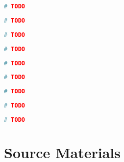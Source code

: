 \documentclass[twoside, 11pt]{article}
\begin{document}
\begin{appendices}
    \begin{lstlisting}[language=python, caption={Prompt Engineering Framework: \textbf{prompt\_utils.py}}, label={lst:prompt-utils}]
    # TODO \end{lstlisting}
    \begin{lstlisting}[language=python, caption={Data Processing Pipeline: \textbf{file\_utils.py}}, label={lst:file-utils}]
    # TODO \end{lstlisting}
    \begin{lstlisting}[language=python, caption={Experiment Controller: \textbf{exp.py}}, label={lst:exp}]
    # TODO \end{lstlisting}
    \begin{lstlisting}[language=python, caption={Evaluation Results Systhesis: \textbf{eval.py}}, label={lst:eval}]
    # TODO \end{lstlisting}
    \begin{lstlisting}[language=python, caption={Truncation Checking: \textbf{check\_truncation.py}}, label={lst:check-truncation}]
    # TODO \end{lstlisting}
    \begin{lstlisting}[language=python, caption={Configuration Constants: \textbf{constants.py}}, label={lst:constants}]
    # TODO \end{lstlisting}
    \begin{lstlisting}[language=python, caption={Inter-Annotator Agreement Calculation: \textbf{agreement.py}}, label={lst:agreement}]
    # TODO \end{lstlisting}
    \begin{lstlisting}[language=python, caption={Quantitative Analysis: \textbf{analysis\_quantitative.py}}, label={lst:analysis-quantitative}]
    # TODO \end{lstlisting}
    \begin{lstlisting}[language=python, caption={Qualitative Analysis: \textbf{analysis\_qualitative.py}}, label={lst:analysis-qualitative}]
    # TODO \end{lstlisting}
    \vp

\section{Source Materials} \label{sec:source_materials}

\end{appendices}
\end{document}
